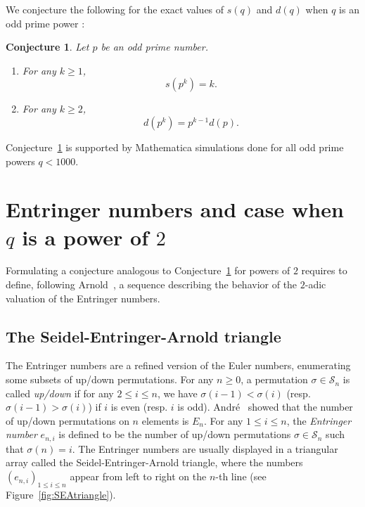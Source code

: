 \documentclass[12pt]{amsart}
\newcommand{\calS}{\mathcal S}
\newtheorem{conj}{Conjecture}
\begin{document}
We conjecture the following for the exact values of $s(q)$ and $d(q)$ when $q$ is an odd prime power :

\begin{conj}
\label{conj:oddprime}
Let $p$ be an odd prime number.
\begin{enumerate}
 \item For any $k\geq1$,
 \begin{equation*}
 s(p^k)=k.
 \end{equation*}
 \item For any $k\geq 2$,
 \begin{equation*}
 d(p^k)=p^{k-1} d(p).
 \end{equation*}
\end{enumerate}
\end{conj}
Conjecture~\ref{conj:oddprime} is supported by Mathematica simulations done for all odd prime powers $q<1000$.

\section{Entringer numbers and case when $q$ is a power of $2$}
\label{sec:powerof2}

Formulating a conjecture analogous to Conjecture~\ref{conj:oddprime} for powers of $2$ requires to define, following Arnold~\cite{A91}, a sequence describing the behavior of the $2$-adic valuation of the Entringer numbers.

\subsection{The Seidel-Entringer-Arnold triangle}

The Entringer numbers are a refined version of the Euler numbers, enumerating some subsets of up/down permutations. For any $n\geq0$, a permutation $\sigma\in\calS_n$ is called \emph{up/down} if for any $2\leq i \leq n$, we have $\sigma(i-1)<\sigma(i)$ (resp. $\sigma(i-1)>\sigma(i)$) if $i$ is even (resp. $i$ is odd). Andr\'e~\cite{A79} showed that the number of up/down permutations on $n$ elements is $E_n$. For any $1 \leq i \leq n$, the \emph{Entringer number} $e_{n,i}$ is defined to be the number of up/down permutations $\sigma\in\calS_n$ such that $\sigma(n)=i$. The Entringer numbers are usually displayed in a triangular array called the Seidel-Entringer-Arnold triangle, where the numbers $(e_{n,i})_{1 \leq i\leq n}$ appear from left to right on the $n$-th line (see Figure~\ref{fig:SEAtriangle}).
\end{document}
